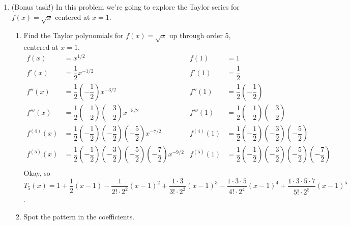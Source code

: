 \documentclass[10pt]{article}
\newenvironment{red}{\color{red}}{\ignorespacesafterend}
\begin{document}
\begin{enumerate}[leftmargin=0pt]
\item (Bonus task!) In this problem we're going to explore the Taylor series for $f(x) = \sqrt{x}$ centered at $x = 1$.
\begin{enumerate}
    \item Find the Taylor polynomials for $f(x) = \sqrt{x}$ up through order 5, centered at $x=1$.
    \begin{red}
        \begin{align*}
            f(x) &= x^{1/2} 
            & f(1) &= 1 \\
            f'(x) &= \dfrac{1}{2} x^{-1/2} 
            &f'(1) &= \dfrac{1}{2} \\
            f''(x) &= \dfrac{1}{2}\left( -\dfrac{1}{2}\right) x^{-3/2} 
            & f''(1) &= \dfrac{1}{2}\left( -\dfrac{1}{2}\right) \\
            f'''(x) &= \dfrac{1}{2}
            \left( -\dfrac{1}{2}\right)
            \left( -\dfrac{3}{2}\right) 
            x^{-5/2} 
            & f'''(1) &= \dfrac{1}{2}
            \left( -\dfrac{1}{2}\right)
            \left( -\dfrac{3}{2}\right)  \\
            f^{(4)}(x) &= \dfrac{1}{2}
            \left( -\dfrac{1}{2}\right)
            \left( -\dfrac{3}{2}\right)
            \left( -\dfrac{5}{2}\right)
            x^{-7/2}
            & f^{(4)}(1) &= \dfrac{1}{2}
            \left( -\dfrac{1}{2}\right)
            \left( -\dfrac{3}{2}\right)
            \left( -\dfrac{5}{2}\right) \\
            f^{(5)}(x) &= \dfrac{1}{2}
            \left( -\dfrac{1}{2}\right)
            \left( -\dfrac{3}{2}\right)
            \left( -\dfrac{5}{2}\right)
            \left( -\dfrac{7}{2}\right)
            x^{-9/2}
            & f^{(5)}(1) &= \dfrac{1}{2}
            \left( -\dfrac{1}{2}\right)
            \left( -\dfrac{3}{2}\right)
            \left( -\dfrac{5}{2}\right)
            \left( -\dfrac{7}{2}\right) \\
        \end{align*}
        Okay, so $T_5(x) = 1 
        + \dfrac12 (x-1) 
        - \dfrac{1}{2!\cdot 2^2}(x-1)^2
        + \dfrac{1\cdot 3}{3!\cdot 2^3}(x-1)^3 
        - \dfrac{1\cdot3 \cdot 5}{4!\cdot 2^4}(x-1)^4
        + \dfrac{1\cdot3 \cdot 5\cdot 7}{5!\cdot 2^5}(x-1)^5$.
    \end{red}
    \item Spot the pattern in the coefficients.


\end{enumerate}
\end{enumerate}
\end{document}
